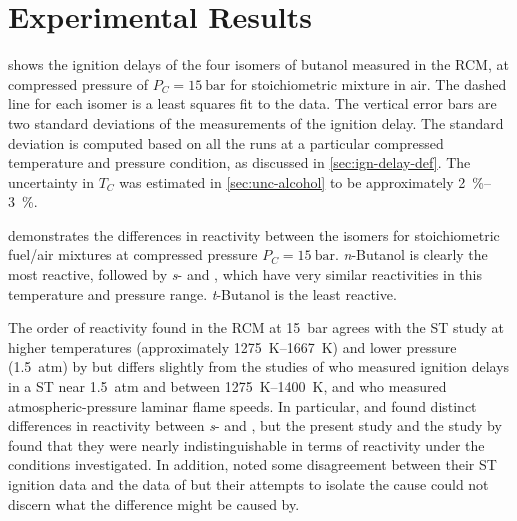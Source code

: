 \documentclass[../main.tex]{subfiles}
\begin{document}
\section{Experimental Results}
\label{sec:buoh-expts}

 shows the ignition delays of the four isomers of
butanol measured in the RCM, at compressed pressure of $P_C=\SI{15}{\bar}$ for
stoichiometric mixture in air. The dashed line for each isomer is a least
squares fit to the data. The vertical error bars are two standard deviations
of the measurements of the ignition delay. The standard deviation is computed
based on all the runs at a particular compressed temperature and pressure
condition, as discussed in \cref{sec:ign-delay-def}. The uncertainty in
$T_C$ was estimated in \cref{sec:unc-alcohol} to be approximately
\SIrange{2}{3}{\percent}.

 demonstrates the differences in reactivity between
the isomers for stoichiometric fuel/air mixtures at compressed pressure
$P_C=\SI{15}{\bar}$. \textit{n}-Butanol is clearly the most reactive, followed by
\textit{s}- and \iBuOH{}, which have very similar reactivities in
this temperature and pressure range. \textit{t}-Butanol is the least reactive.

The order of reactivity found in the RCM at \SI{15}{\bar} agrees with the ST
study at higher temperatures (approximately \SIrange{1275}{1667}{\kelvin}) and lower pressure
(\SI{1.5}{atm}) by \textcite{Stranic2012} but differs slightly from the studies of
\textcite{Moss2008} who measured ignition delays in a ST near \SI{1.5}{atm}
and between \SIrange{1275}{1400}{\kelvin}, and \textcite{Veloo2011a} who measured
atmospheric-pressure laminar flame speeds. In particular, \textcite{Moss2008}
and \textcite{Veloo2011a} found distinct differences in reactivity between
\textit{s}- and \iBuOH{}, but the present study and the study by
\textcite{Stranic2012} found that they were nearly indistinguishable in terms
of reactivity under the conditions investigated. In addition,
\textcite{Stranic2012} noted some disagreement between their ST
ignition data and the data of \textcite{Moss2008} but their attempts to isolate
the cause could not discern what the difference might be caused by.
\end{document}

